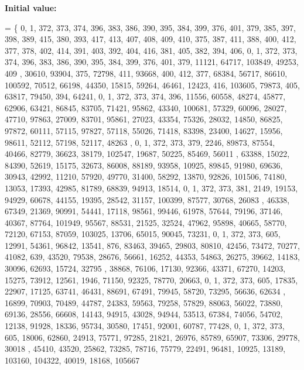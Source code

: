 {\bfseries Initial value\+:}
\begin{DoxyCode}
= \{
    0, 1, 372, 373, 374, 396, 383, 386, 390, 395, 384, 399, 376, 401, 379, 385, 397, 398, 389, 415, 380, 
      393, 417, 413, 407, 408, 409, 410, 375, 387, 411, 388, 400, 412, 377, 378, 402, 414, 391, 403, 392, 404, 416, 
      381, 405, 382, 394, 406, 
    0, 1, 372, 373, 374, 396, 383, 386, 390, 395, 384, 399, 376, 401, 379, 11121, 64717, 103849, 49253, 409
      , 30610, 93904, 375, 72798, 411, 93668, 400, 412, 377, 68384, 56717, 86610, 100592, 70512, 66198, 44350, 
      15815, 59264, 46461, 12423, 416, 103605, 79873, 405, 63817, 79450, 394, 64241, 
    0, 1, 372, 373, 374, 396, 11556, 60558, 48274, 45877, 62906, 63421, 86845, 83705, 71421, 95862, 43340, 
      100681, 57329, 60096, 28027, 47710, 97863, 27009, 83701, 95861, 27023, 43354, 75326, 28032, 14850, 86825, 
      97872, 60111, 57115, 97827, 57118, 55026, 71418, 83398, 23400, 14627, 15956, 98611, 52112, 57198, 52117, 48263
      , 
    0, 1, 372, 373, 379, 2246, 89873, 87554, 40466, 82779, 36623, 38179, 102547, 19687, 50225, 85469, 56011
      , 63388, 15022, 84390, 52619, 15175, 32673, 86008, 88189, 93958, 10925, 89845, 91980, 69636, 30943, 42992, 
      11210, 57920, 49770, 31400, 58292, 13870, 92826, 101506, 74180, 13053, 17393, 42985, 81789, 68839, 94913, 
      18514, 
    0, 1, 372, 373, 381, 2149, 19153, 94929, 60678, 44155, 19395, 28542, 31157, 100399, 87577, 30768, 26083
      , 46338, 67349, 21369, 90991, 54441, 17118, 98561, 99446, 61978, 57644, 79196, 37146, 40367, 87764, 101949, 
      95567, 88531, 21525, 32524, 47962, 95898, 40665, 58770, 72120, 67153, 87059, 103025, 13706, 65015, 90045, 
      73231, 
    0, 1, 372, 373, 605, 12991, 54361, 96842, 13541, 876, 83463, 39465, 29803, 80810, 42456, 73472, 70277, 
      41082, 639, 43520, 79538, 28676, 56661, 16252, 44353, 54863, 26275, 39662, 14183, 30096, 62693, 15724, 32795
      , 38868, 76106, 17130, 92366, 43371, 67270, 14203, 15275, 73912, 12561, 1946, 71150, 92325, 78770, 20663, 
    0, 1, 372, 373, 605, 17835, 22907, 17125, 63741, 46431, 88691, 67491, 79945, 58720, 73295, 56636, 62634
      , 16899, 70903, 70489, 44787, 24383, 59563, 79258, 57829, 88063, 56022, 73880, 69136, 28556, 66608, 14143, 
      94915, 43028, 94944, 53513, 67384, 74056, 54702, 12138, 91928, 18336, 95734, 30580, 17451, 92001, 60787, 
      77428, 
    0, 1, 372, 373, 605, 18006, 62860, 24913, 75771, 97285, 21821, 26976, 85789, 65907, 73306, 29778, 30018
      , 45410, 43520, 25862, 73285, 78716, 75779, 22491, 96481, 10925, 13189, 103160, 104322, 40019, 18168, 105667

\end{DoxyCode}
